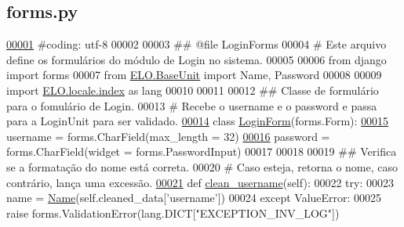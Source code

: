 \hypertarget{Login_2forms_8py_source}{}\subsection{forms.\+py}
\label{Login_2forms_8py_source}

\begin{DoxyCode}
\hypertarget{Login_2forms_8py_source_l00001}{}\hyperlink{namespaceLogin_1_1forms}{00001} \textcolor{comment}{#coding: utf-8}
00002 
00003 \textcolor{comment}{## @file LoginForms}
00004 \textcolor{comment}{# Este arquivo define os formulários do módulo de Login no sistema.}
00005 
00006 \textcolor{keyword}{from} django \textcolor{keyword}{import} forms
00007 \textcolor{keyword}{from} \hyperlink{namespaceELO_1_1BaseUnit}{ELO.BaseUnit} \textcolor{keyword}{import} Name, Password
00008 
00009 \textcolor{keyword}{import} \hyperlink{namespaceELO_1_1locale_1_1index}{ELO.locale.index} \textcolor{keyword}{as} lang
00010 
00011 
00012 \textcolor{comment}{## Classe de formulário para o fomulário de Login.}
00013 \textcolor{comment}{# Recebe o username e o password e passa para a LoginUnit para ser validado.}
\hypertarget{Login_2forms_8py_source_l00014}{}\hyperlink{classLogin_1_1forms_1_1LoginForm}{00014} \textcolor{keyword}{class }\hyperlink{classLogin_1_1forms_1_1LoginForm}{LoginForm}(forms.Form):
\hypertarget{Login_2forms_8py_source_l00015}{}\hyperlink{classLogin_1_1forms_1_1LoginForm_af3766bb4ea8cabdf57ad77214b7545fd}{00015}     username = forms.CharField(max\_length = 32)
\hypertarget{Login_2forms_8py_source_l00016}{}\hyperlink{classLogin_1_1forms_1_1LoginForm_a23e321f790e9c7bfc3e9abf767826a2d}{00016}     password = forms.CharField(widget = forms.PasswordInput)
00017 
00018     
00019     \textcolor{comment}{## Verifica se a formatação do nome está correta.}
00020     \textcolor{comment}{# Caso esteja, retorna o nome, caso contrário, lança uma excessão.}
\hypertarget{Login_2forms_8py_source_l00021}{}\hyperlink{classLogin_1_1forms_1_1LoginForm_a23e2651502381fa3a98d416fbb1a0527}{00021}     \textcolor{keyword}{def }\hyperlink{classLogin_1_1forms_1_1LoginForm_a23e2651502381fa3a98d416fbb1a0527}{clean\_username}(self):
00022         \textcolor{keywordflow}{try}:
00023             name = \hyperlink{classELO_1_1BaseUnit_1_1Name}{Name}(self.cleaned\_data[\textcolor{stringliteral}{'username'}])
00024         \textcolor{keywordflow}{except} ValueError:
00025             \textcolor{keywordflow}{raise} forms.ValidationError(lang.DICT[\textcolor{stringliteral}{"EXCEPTION\_INV\_LOG"}])

\end{DoxyCode}
